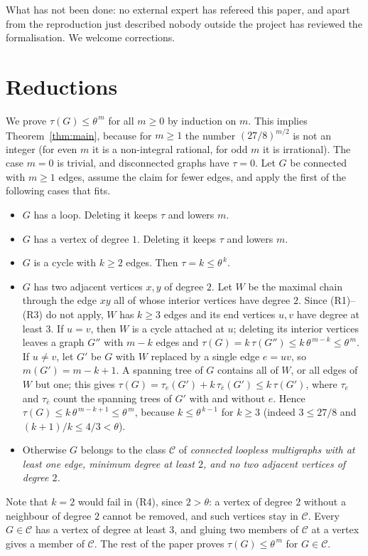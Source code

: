\documentclass[11pt]{amsart}
\theoremstyle{plain}
\theoremstyle{remark}
\newcommand{\cC}{\mathcal{C}}
\newcommand{\tht}{\theta}
\begin{document}
What has not been done: no external expert has refereed this paper, and apart from the reproduction just described
nobody outside the project has reviewed the formalisation. We welcome corrections.

\section{Reductions}\label{sec:red}

We prove $\tau(G)\le\tht^{\,m}$ for all $m\ge0$ by induction on $m$. This implies Theorem~\ref{thm:main}, because
for $m\ge1$ the number $(27/8)^{m/2}$ is not an integer (for even $m$ it is a non-integral rational, for odd $m$
it is irrational). The case $m=0$ is trivial, and disconnected graphs have $\tau=0$. Let $G$ be connected with
$m\ge1$ edges, assume the claim for fewer edges, and apply the first of the following cases that fits.

\begin{itemize}
\item[(R1)] $G$ has a loop. Deleting it keeps $\tau$ and lowers $m$.
\item[(R2)] $G$ has a vertex of degree $1$. Deleting it keeps $\tau$ and lowers $m$.
\item[(R3)] $G$ is a cycle with $k\ge2$ edges. Then $\tau=k\le\tht^{\,k}$.
\item[(R4)] $G$ has two adjacent vertices $x,y$ of degree $2$. Let $W$ be the maximal chain through the edge $xy$
  all of whose interior vertices have degree $2$. Since (R1)--(R3) do not apply, $W$ has $k\ge3$ edges and its end
  vertices $u,v$ have degree at least $3$.
  If $u=v$, then $W$ is a cycle attached at $u$; deleting its interior vertices leaves a graph $G''$ with $m-k$
  edges and $\tau(G)=k\,\tau(G'')\le k\,\tht^{\,m-k}\le\tht^{\,m}$.
  If $u\ne v$, let $G'$ be $G$ with $W$ replaced by a single edge $e=uv$, so $m(G')=m-k+1$. A spanning tree of $G$
  contains all of $W$, or all edges of $W$ but one; this gives
  $\tau(G)=\tau_e(G')+k\,\tau_{\bar e}(G')\le k\,\tau(G')$, where $\tau_e$ and $\tau_{\bar e}$ count the spanning trees
  of $G'$ with and without $e$. Hence $\tau(G)\le k\,\tht^{\,m-k+1}\le\tht^{\,m}$, because $k\le\tht^{\,k-1}$ for
  $k\ge3$ (indeed $3\le27/8$ and $(k+1)/k\le4/3<\tht$).
\item[(R5)] Otherwise $G$ belongs to the class $\cC$ of \emph{connected loopless multigraphs with at least one
  edge, minimum degree at least $2$, and no two adjacent vertices of degree $2$.}
\end{itemize}
Note that $k=2$ would fail in (R4), since $2>\tht$: a vertex of degree $2$ without a neighbour of degree $2$
cannot be removed, and such vertices stay in $\cC$. Every $G\in\cC$ has a vertex of degree at least $3$, and gluing two members of $\cC$ at a vertex gives a
member of $\cC$. The rest of the paper proves $\tau(G)\le\tht^{\,m}$ for $G\in\cC$.
\end{document}
